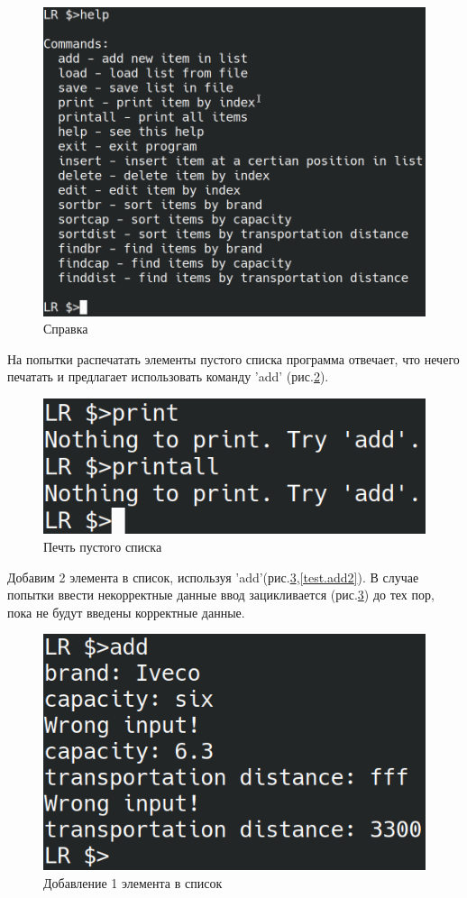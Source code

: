 \begin{figure}[H]
    \centering
    \includegraphics[width=0.9\linewidth]{photo/test.help}
    \caption{Справка}
    \label{test.help}
\end{figure}

На попытки распечатать элементы пустого списка
программа отвечает, что нечего печатать и предлагает
использовать команду 'add' (рис.\ref{test.print_empty}).

\begin{figure}[H]
    \centering
    \includegraphics[width=0.9\linewidth]{photo/test.print_empty}
    \caption{Печть пустого списка}
    \label{test.print_empty}
\end{figure}

Добавим 2 элемента в список, используя 'add'(рис.\ref{test.add},\ref{test.add2}).
В случае попытки ввести некорректные данные 
ввод зацикливается (рис.\ref{test.add}) до тех пор,
пока не будут введены корректные данные.

\begin{figure}[H]
    \centering
    \includegraphics[width=0.9\linewidth]{photo/test.add}
    \caption{Добавление 1 элемента в список}
    \label{test.add}
\end{figure}

